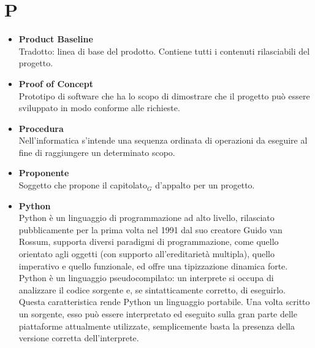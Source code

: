 \chapter{P} \label{P}
	\begin{itemize}
		\item \textbf{Product Baseline}\\
		Tradotto: linea di base del prodotto.
		Contiene tutti i contenuti rilasciabili del progetto.
		
		\item \textbf{Proof of Concept}\\
		Prototipo di software che ha lo scopo di dimostrare che il progetto può essere sviluppato in modo conforme alle richieste.
		
		\item \textbf{Procedura}\\
		Nell'informatica s'intende una sequenza ordinata di operazioni da eseguire al fine di raggiungere un determinato scopo.

		\item \textbf{Proponente}\\
		Soggetto che propone il capitolato$_G$ d'appalto per un progetto.
		
		\item \textbf{Python}\\
		Python è un linguaggio di programmazione ad alto livello, rilasciato pubblicamente per la prima volta nel 1991 dal suo creatore Guido van Rossum, supporta diversi paradigmi di programmazione, come quello orientato agli oggetti (con supporto all'ereditarietà multipla), quello imperativo e quello funzionale, ed offre una tipizzazione dinamica forte.
		Python è un linguaggio pseudocompilato: un interprete si occupa di analizzare il codice sorgente e, se sintatticamente corretto, di eseguirlo. Questa caratteristica rende Python un linguaggio portabile. Una volta scritto un sorgente, esso può essere interpretato ed eseguito sulla gran parte delle piattaforme attualmente utilizzate, semplicemente basta la presenza della versione corretta dell’interprete.
	\end{itemize}
